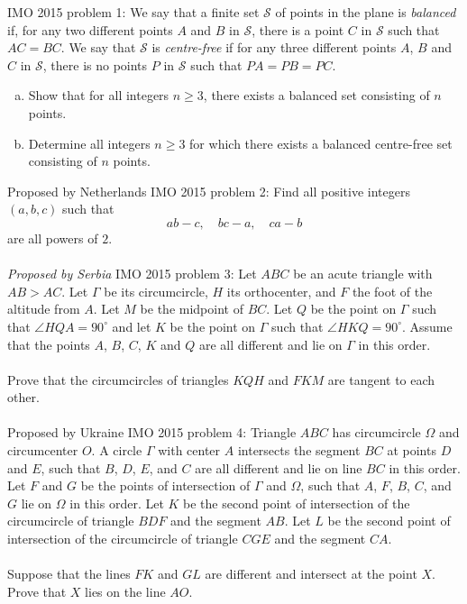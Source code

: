 IMO 2015 problem 1:  We say that a finite set $\mathcal{S}$ of points in the plane is \textit{balanced} if, for any two different points $A$ and $B$ in $\mathcal{S}$, there is a point $C$ in $\mathcal{S}$ such that $AC=BC$. We say that $\mathcal{S}$ is \textit{centre-free} if for any three different points $A$, $B$ and $C$ in $\mathcal{S}$, there is no points $P$ in $\mathcal{S}$ such that $PA=PB=PC$.
\begin{enumerate}[(a)]
  \item Show that for all integers $n\ge 3$, there exists a balanced set consisting of $n$ points.
  \item Determine all integers $n\ge 3$ for which there exists a balanced centre-free set consisting of $n$ points.
\end{enumerate}
Proposed by Netherlands 
IMO 2015 problem 2:  Find all positive integers $(a,b,c)$ such that
\[ ab-c,\quad bc-a,\quad ca-b \]
are all powers of $2$. \\\\
\textit{Proposed by Serbia} 
IMO 2015 problem 3:  Let $ABC$ be an acute triangle with $AB > AC$. Let $\Gamma $ be its circumcircle, $H$ its orthocenter, and $F$ the foot of the altitude from $A$. Let $M$ be the midpoint of $BC$. Let $Q$ be the point on $\Gamma$ such that $\angle HQA = 90^{\circ}$ and let $K$ be the point on $\Gamma$ such that $\angle HKQ = 90^{\circ}$. Assume that the points $A$, $B$, $C$, $K$ and $Q$ are all different and lie on $\Gamma$ in this order. \\\\
Prove that the circumcircles of triangles $KQH$ and $FKM$ are tangent to each other. \\\\
Proposed by Ukraine 
IMO 2015 problem 4:  Triangle $ABC$ has circumcircle $\Omega$ and circumcenter $O$. A circle $\Gamma$ with center $A$ intersects the segment $BC$ at points $D$ and $E$, such that $B$, $D$, $E$, and $C$ are all different and lie on line $BC$ in this order. Let $F$ and $G$ be the points of intersection of $\Gamma$ and $\Omega$, such that $A$, $F$, $B$, $C$, and $G$ lie on $\Omega$ in this order. Let $K$ be the second point of intersection of the circumcircle of triangle $BDF$ and the segment $AB$. Let $L$ be the second point of intersection of the circumcircle of triangle $CGE$ and the segment $CA$. \\\\
Suppose that the lines $FK$ and $GL$ are different and intersect at the point $X$. Prove that $X$ lies on the line $AO$. \\\\
